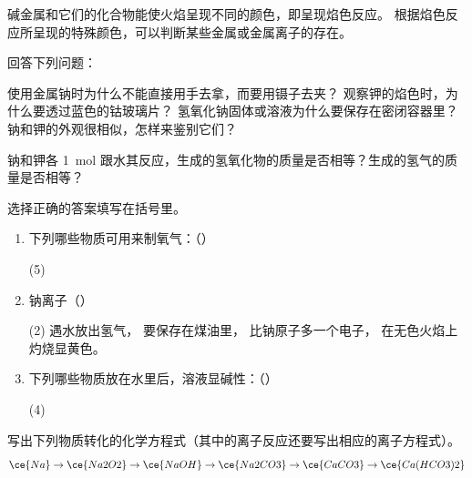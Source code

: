 碱金属和它们的化合物能使火焰呈现不同的颜色，即呈现焰色反应。
根据焰色反应所呈现的特殊颜色，可以判断某些金属或金属离子的存在。

\begin{Review}
  \begin{question}
    \item 回答下列问题：
    \begin{tasks}[label=(\arabic*)]
      \task 使用金属钠时为什么不能直接用手去拿，而要用镊子去夹？
      \task 观察钾的焰色时，为什么要透过蓝色的钴玻璃片？
      \task 氢氧化钠固体或溶液为什么要保存在密闭容器里？
      \task 钠和钾的外观很相似，怎样来鉴别它们？
    \end{tasks}
    \item 钠和钾各 \qty{1}{mol} 跟水其反应，生成的氢氧化物的质量是否相等？生成的氢气的质量是否相等？
    \item 选择正确的答案填写在括号里。
    \begin{enumerate}[itemindent=1.7em]
      \item 下列哪些物质可用来制氧气：\hfill（\hspace{2em}）
      \begin{tasks}[label=\Alph*.](5)
        \task {}
        \task {}
        \task {}
        \task {}
        \task {}
      \end{tasks}
      \item 钠离子\hfill（\hspace{2em}）
      \begin{tasks}[label=\Alph*.](2)
        \task 遇水放出氢气，
        \task 要保存在煤油里，
        \task 比钠原子多一个电子，
        \task 在无色火焰上灼烧显黄色。
      \end{tasks}
      \item 下列哪些物质放在水里后，溶液显碱性：\hfill（\hspace{2em}）
      \begin{tasks}[label=\Alph*.](4)
        \task {}
        \task {}
        \task {}
        \task {}
      \end{tasks}
    \end{enumerate}
    \item 写出下列物质转化的化学方程式（其中的离子反应还要写出相应的离子方程式）。
    \[ \ce{Na} \to \ce{Na2O2} \to \ce{NaOH} \to \ce{Na2CO3} \to \ce{CaCO3} \to \ce{Ca(HCO3)2}\]
  \end{question}
\end{Review}